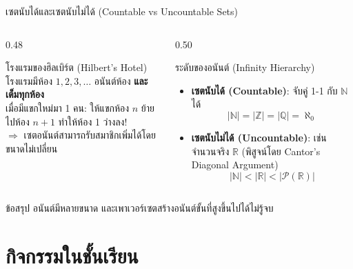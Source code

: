 \begin{frame}{เซตนับได้และเซตนับไม่ได้ (Countable vs Uncountable Sets)}
  \begin{columns}[T]
    \begin{column}{0.48\textwidth}
      \begin{block}{โรงแรมของฮิลเบิร์ต (Hilbert's Hotel)}
        โรงแรมมีห้อง $1, 2, 3, \ldots$ อนันต์ห้อง \textbf{และเต็มทุกห้อง} \\
        เมื่อมีแขกใหม่มา 1 คน: ให้แขกห้อง $n$ ย้ายไปห้อง $n+1$ ทำให้ห้อง 1 ว่างลง! \\
        $\Rightarrow$ เซตอนันต์สามารถรับสมาชิกเพิ่มได้โดยขนาดไม่เปลี่ยน
      \end{block}
    \end{column}
    \begin{column}{0.50\textwidth}
      \begin{block}{ระดับของอนันต์ (Infinity Hierarchy)}
        \begin{itemize}\small
          \item \textbf{เซตนับได้ (Countable)}: จับคู่ 1-1 กับ $\mathbb{N}$ ได้
                \[ |\mathbb{N}| = |\mathbb{Z}| = |\mathbb{Q}| = \aleph_0 \]
          \item \textbf{เซตนับไม่ได้ (Uncountable)}: เช่น จำนวนจริง $\mathbb{R}$ (พิสูจน์โดย Cantor's Diagonal Argument)
                \[ |\mathbb{N}| < |\mathbb{R}| < |\mathcal{P}(\mathbb{R})| \]
        \end{itemize}
      \end{block}
    \end{column}
  \end{columns}
  \vspace{0.2em}
  \begin{exampleblock}{ข้อสรุป}
    อนันต์มีหลายขนาด และเพาเวอร์เซตสร้างอนันต์ขั้นที่สูงขึ้นไปได้ไม่รู้จบ
  \end{exampleblock}
\end{frame}


\section{กิจกรรมในชั้นเรียน}

